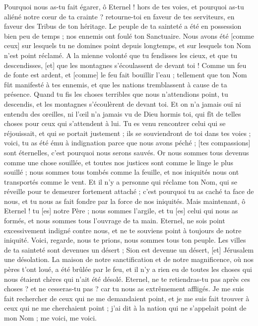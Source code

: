 \begin{multicols}{2}
Pourquoi nous as-tu fait égarer, ô Eternel ! hors de tes voies, et pourquoi as-tu aliéné notre cœur de ta crainte ? retourne-toi en faveur de tes serviteurs, en faveur des Tribus de ton héritage.
Le peuple de ta sainteté a été en possession bien peu de temps ; nos ennemis ont foulé ton Sanctuaire.
Nous avons été [comme ceux] sur lesquels tu ne domines point depuis longtemps, et sur lesquels ton Nom n'est point réclamé.
\VerseOne{}A la mienne volonté que tu fendisses les cieux, et que tu descendisses, [et] que les montagnes s'écoulassent de devant toi !
Comme un feu de fonte est ardent, et [comme] le feu fait bouillir l'eau ; tellement que ton Nom fût manifesté à tes ennemis, et que les nations tremblassent à cause de ta présence.
Quand tu fis les choses terribles que nous n'attendions point, tu descendis, et les montagnes s'écoulèrent de devant toi.
Et on n'a jamais ouï ni entendu des oreilles, ni l'œil n'a jamais vu de Dieu hormis toi, qui fît de telles choses pour ceux qui s'attendent à lui.
Tu es venu rencontrer celui qui se réjouissait, et qui se portait justement ; ils se souviendront de toi dans tes voies ; voici, tu as été ému à indignation parce que nous avons péché ; [tes compassions] sont éternelles, c'est pourquoi nous serons sauvés.
Or nous sommes tous devenus comme une chose souillée, et toutes nos justices sont comme le linge le plus souillé ; nous sommes tous tombés comme la feuille, et nos iniquités nous ont transportés comme le vent.
Et il n'y a personne qui réclame ton Nom, qui se réveille pour te demeurer fortement attaché ; c'est pourquoi tu as caché ta face de nous, et tu nous as fait fondre par la force de nos iniquités.
Mais maintenant, ô Eternel ! tu [es] notre Père ; nous sommes l'argile, et tu [es] celui qui nous as formés, et nous sommes tous l'ouvrage de ta main.
Eternel, ne sois point excessivement indigné contre nous, et ne te souviens point à toujours de notre iniquité. Voici, regarde, nous te prions, nous sommes tous ton peuple.
Les villes de ta sainteté sont devenues un désert ; Sion est devenue un désert, [et] Jérusalem une désolation.
La maison de notre sanctification et de notre magnificence, où nos pères t'ont loué, a été brûlée par le feu, et il n'y a rien eu de toutes les choses qui nous étaient chères qui n'ait été désolé.
Eternel, ne te retiendras-tu pas après ces choses ? et ne cesseras-tu pas ? car tu nous as extrêmement affligés.
\VerseOne{}Je me suis fait rechercher de ceux qui ne me demandaient point, et je me suis fait trouver à ceux qui ne me cherchaient point ; j'ai dit à la nation qui ne s'appelait point de mon Nom ; me voici, me voici.

\end{multicols}
